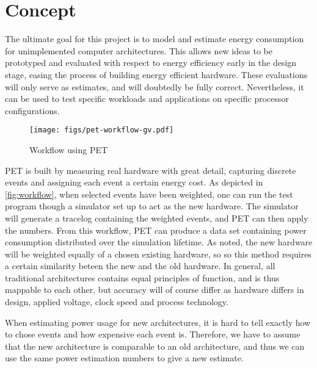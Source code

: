 \section{Concept}
The ultimate goal for this project is to model and estimate energy consumption
for unimplemented computer architectures. This allows new ideas to be prototyped
and evaluated with respect to energy efficiency early in the design stage,
easing the process of building energy efficient hardware. These evaluations will
only serve as estimates, and will doubtedly be fully correct. Nevertheless, it
can be used to test specific workloads and applications on specific processor
configurations.

\begin{figure}
    \texttt{[image: figs/pet-workflow-gv.pdf]}
    \caption{Workflow using PET}
    \label{fig:workflow}
\end{figure}

PET is built by measuring real hardware with great detail, capturing discrete
events and assigning each event a certain energy cost. As depicted in
\autoref{fig:workflow}, when selected events have been weighted, one can run the
test program though a simulator set up to act as the new hardware. The simulator
will generate a tracelog containing the weighted events, and PET can then apply
the numbers. From this workflow, PET can produce a data set containing power
consumption distributed over the simulation lifetime. As noted, the new hardware
will be weighted equally of a chosen existing hardware, so so this method
requires a certain similarity beteen the new and the old hardware. In general,
all traditional architectures contains equal principles of function, and is thus
mappable to each other, but accuracy will of course differ as hardware differs
in design, applied voltage, clock speed and process technology.

When estimating power usage for new architectures, it is hard to tell exactly
how to chose events and how expensive each event is. Therefore, we have to
assume that the new architecture is comparable to an old architecture, and thus
we can use the same power estimation numbers to give a new estimate.
